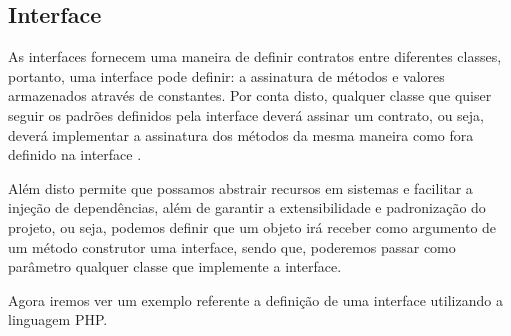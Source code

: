 \subsection{Interface}

As interfaces fornecem uma maneira de definir contratos entre diferentes
classes, portanto, uma interface pode definir: a assinatura de métodos e
valores armazenados através de constantes. Por conta disto, qualquer classe  que
quiser seguir os padrões definidos pela interface deverá assinar um contrato,
ou seja, deverá implementar a assinatura dos métodos da mesma maneira como  fora
definido na interface \cite{programmingPhp}.

Além disto permite que possamos abstrair recursos em sistemas e facilitar a
injeção de dependências, além de garantir a extensibilidade e padronização do
projeto, ou seja, podemos definir que um objeto irá receber como argumento de
um método construtor uma interface, sendo que, poderemos passar como parâmetro
qualquer classe que implemente a interface.

Agora iremos ver um exemplo referente a definição de uma interface utilizando  a
linguagem PHP.
